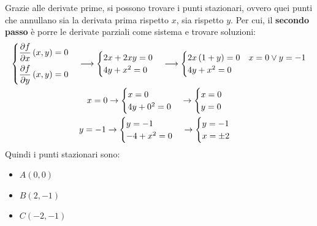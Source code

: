 \documentclass[a4paper]{article}
\begin{document}
	\noindent
	Grazie alle derivate prime, si possono trovare i punti stazionari, ovvero quei punti che annullano sia la derivata prima rispetto $x$, sia rispetto $y$. Per cui, il \textbf{secondo passo} è porre le derivate parziali come sistema e trovare soluzioni:
	\begin{gather*}
		\begin{cases}
			\dfrac{\partial f}{\partial x}\left(x,y\right) = 0 \vspace{.5em}\\
			\dfrac{\partial f}{\partial y}\left(x,y\right) = 0
		\end{cases}
		\longrightarrow
		\begin{cases}
			2x + 2xy = 0 \\
			4y + x^{2} = 0
		\end{cases}
		\longrightarrow
		\begin{cases}
			2x\left(1+y\right) = 0 & x=0 \lor y=-1 \\
			4y + x^{2} = 0
		\end{cases} \\
		x = 0 \rightarrow
		\begin{cases}
			x = 0 \\
			4y + 0^{2} = 0
		\end{cases}
		\rightarrow
		\begin{cases}
			x = 0 \\
			y = 0
		\end{cases} \\
		y = -1 \rightarrow
		\begin{cases}
			y = -1 \\
			-4 + x^{2} = 0
		\end{cases}
		\rightarrow
		\begin{cases}
			y = -1 \\
			x = \pm 2
		\end{cases}
	\end{gather*}
	Quindi i punti stazionari sono:
	\begin{multicols}{3}
		\begin{itemize}
			\item $A\left(0,0\right)$
			\item $B\left(2,-1\right)$
			\item $C\left(-2,-1\right)$
		\end{itemize}
	\end{multicols}
	
\end{document}
